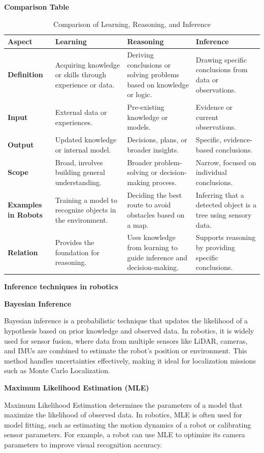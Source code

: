 \documentclass{book}
\providecommand{\ProjectDeepHeading}[2]{%
    \par\medskip\noindent\textbf{#2}\par\smallskip
}
\begin{document}
\ProjectDeepHeading{3}{Comparison Table}
\begin{table}[h!]
    \centering
    \begin{tabular}{|l|l|l|l|}
        \hline
        \textbf{Aspect} & \textbf{Learning} & \textbf{Reasoning} & \textbf{Inference} \\ \hline
        \textbf{Definition} & Acquiring knowledge or skills through experience or data. & Deriving conclusions or solving problems based on knowledge or logic. & Drawing specific conclusions from data or observations. \\ \hline
        \textbf{Input} & External data or experiences. & Pre-existing knowledge or models. & Evidence or current observations. \\ \hline
        \textbf{Output} & Updated knowledge or internal model. & Decisions, plans, or broader insights. & Specific, evidence-based conclusions. \\ \hline
        \textbf{Scope} & Broad, involves building general understanding. & Broader problem-solving or decision-making process. & Narrow, focused on individual conclusions. \\ \hline
        \textbf{Examples in Robots} & Training a model to recognize objects in the environment. & Deciding the best route to avoid obstacles based on a map. & Inferring that a detected object is a tree using sensory data. \\ \hline
        \textbf{Relation} & Provides the foundation for reasoning. & Uses knowledge from learning to guide inference and decision-making. & Supports reasoning by providing specific conclusions. \\ \hline
    \end{tabular}
    \caption{Comparison of Learning, Reasoning, and Inference}
\end{table}
\ProjectDeepHeading{3}{Inference techniques in robotics}

    \ProjectDeepHeading{4}{Bayesian Inference}
    Bayesian inference is a probabilistic technique that updates the likelihood of a hypothesis based on prior knowledge and observed data. In robotics, it is widely used for sensor fusion, where data from multiple sensors like LiDAR, cameras, and IMUs are combined to estimate the robot's position or environment. This method handles uncertainties effectively, making it ideal for localization missions such as Monte Carlo Localization.

    \ProjectDeepHeading{4}{Maximum Likelihood Estimation (MLE)}
    Maximum Likelihood Estimation determines the parameters of a model that maximize the likelihood of observed data. In robotics, MLE is often used for model fitting, such as estimating the motion dynamics of a robot or calibrating sensor parameters. For example, a robot can use MLE to optimize its camera parameters to improve visual recognition accuracy. 
\end{document}
